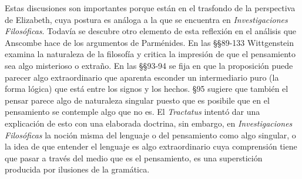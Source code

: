 Estas discusiones son importantes porque están en el trasfondo de la perspectiva de Elizabeth, cuya postura es análoga a la que se encuentra en \emph{Investigaciones Filosóficas}. Todavía se descubre otro elemento de esta reflexión en el análisis que Anscombe hace de los argumentos de Parménides. En las \S\S89-133 Wittgenstein examina la naturaleza de la filosofía y critica la impresión de que el pensamiento sea algo misterioso o extraño. En las \S\S93-94 se fija en que la proposición puede parecer algo extraordinario que aparenta esconder un intermediario puro (la forma lógica) que está entre los signos y los hechos. \S95 sugiere que también el pensar parece algo de naturaleza singular puesto que es posibile que en el pensamiento se contemple algo que no es. El \emph{Tractatus} intentó dar una explicación de esto con una elaborada doctrina, sin embargo,
en \emph{Investigaciones Filosóficas} la noción misma del lenguaje o del pensamiento como algo singular, o la idea de que entender el lenguaje es algo extraordinario cuya comprensión tiene que pasar a través del medio que es el pensamiento, es una superstición producida por ilusiones de la gramática.

